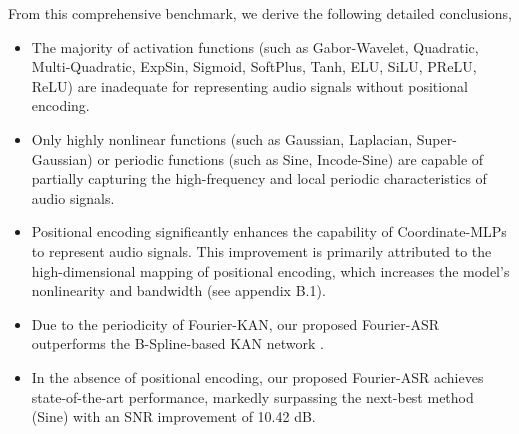 \documentclass[letterpaper]{article} %
\begin{document}
From this comprehensive benchmark, we derive the following detailed conclusions,
\begin{itemize}
    \item The majority of activation functions (such as Gabor-Wavelet, Quadratic, Multi-Quadratic, ExpSin, Sigmoid, SoftPlus, Tanh, ELU, SiLU, PReLU, ReLU) are inadequate for representing audio signals without positional encoding.

    \item Only highly nonlinear functions (such as Gaussian, Laplacian, Super-Gaussian) or periodic functions (such as Sine, Incode-Sine) are capable of partially capturing the high-frequency and local periodic characteristics of audio signals.

    \item Positional encoding significantly enhances the capability of Coordinate-MLPs to represent audio signals. This improvement is primarily attributed to the high-dimensional mapping of positional encoding, which increases the model's nonlinearity and bandwidth (see appendix B.1).

    \item Due to the periodicity of Fourier-KAN, our proposed Fourier-ASR outperforms the B-Spline-based KAN network \cite{liu2024kan}.

    \item In the absence of positional encoding, our proposed Fourier-ASR achieves state-of-the-art performance, markedly surpassing the next-best method (Sine) with an SNR improvement of 10.42 dB.
\end{itemize}
\end{document}
